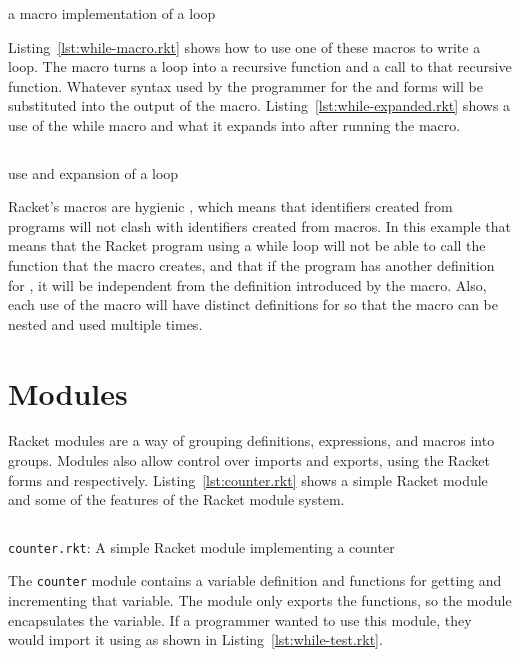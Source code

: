 \begin{listing}
  \inputminted{racket}{listings/while-macro.rkt}
  \caption{a macro implementation of a  loop}
  \label{lst:while-macro.rkt}
\end{listing}
Listing~\ref{lst:while-macro.rkt} shows how to use one of these macros to write a  loop. 
The macro turns a  loop into a recursive function and a call to that recursive function.
Whatever syntax used by the programmer for the  and  forms will be substituted into the output of the macro. 
Listing~\ref{lst:while-expanded.rkt} shows a use of the while macro and what it expands into after running the macro. 
\begin{listing}
  \inputminted{racket}{listings/while-expanded.rkt}
  \caption{use and expansion of a  loop}
  \label{lst:while-expanded.rkt}
\end{listing}
Racket's macros are hygienic \cite{hygiene}, which means that identifiers created from programs will not clash with identifiers created from macros. 
In this example that means that the Racket program using a while loop will not be able to call the  function that the macro creates, and that if the program has another definition for , it will be independent from the definition introduced by the macro.
Also, each use of the macro will have distinct definitions for  so that the macro can be nested and used multiple times.
\section{Modules}
Racket modules are a way of grouping definitions, expressions, and macros into groups. 
Modules also allow control over imports and exports, using the Racket forms  and  respectively.
Listing~\ref{lst:counter.rkt} shows a simple Racket module and some of the features of the Racket module system.
\begin{listing}
  \inputminted{racket}{listings/counter.rkt}
  \caption{\texttt{counter.rkt}: A simple Racket module implementing a counter}
  \label{lst:counter.rkt}
\end{listing}
The \texttt{counter} module contains a variable definition and functions for getting and incrementing that variable.
The module only exports the functions, so the module encapsulates the variable.
If a programmer wanted to use this module, they would import it using  as shown in Listing~\ref{lst:while-test.rkt}. 

